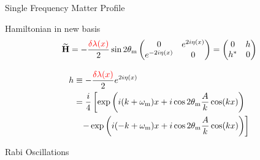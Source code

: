 \documentclass[9pt]{beamer}
\begin{document}
\begin{darkframes}
\begin{frame}{Single Frequency Matter Profile}


Hamiltonian in new basis
\begin{equation*}
    \mathbf{\widetilde H} = - \frac{ {\color{red}\delta \lambda(x)}  }{2} \sin 2\theta_{\mathrm{m}} \begin{pmatrix} 0 & e^{2i\eta(x)} \\ e^{-2 i\eta(x) } & 0 \end{pmatrix} = \begin{pmatrix}
    0 & h \\
    h^* & 0
    \end{pmatrix}
\end{equation*}


\begin{tcolorbox}[title=Hamiltonian in New Basis]

\begin{align*}
    h &\equiv -\frac{ {\color{red}\delta \lambda(x)}  }{2} e^{2i\eta(x)} \\
    & = \frac{i}{4}\left[ \exp\left(i(k + \omega_{\mathrm m})x + i\cos 2\theta_{\mathrm m} \frac{A}{k} \cos (k x ) \right) \right. \\
    &\phantom{=} \left. - \exp\left(i(-k  + \omega_{\mathrm m})x + i\cos 2\theta_{\mathrm m} \frac{A}{k} \cos (k x ) \right) \right]
\end{align*}


\end{tcolorbox}




\end{frame}




\begin{frame}{Rabi Oscillations}

\end{frame}
\end{darkframes}
\end{document}
